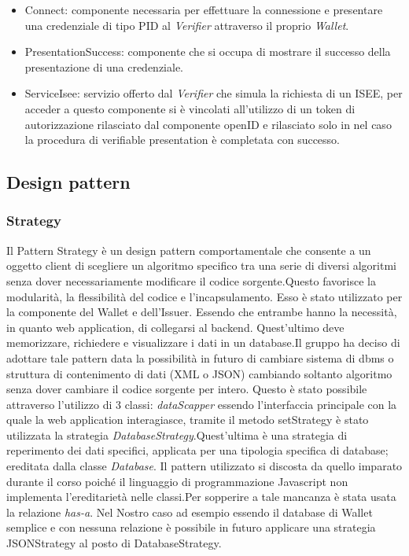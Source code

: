 \begin{itemize}
    \item Connect: componente necessaria per effettuare la connessione e presentare una credenziale di tipo PID al \textit{Verifier} attraverso il proprio \textit{Wallet}.
    \item PresentationSuccess: componente che si occupa di mostrare il successo della presentazione di una credenziale.
    \item ServiceIsee: servizio offerto dal \textit{Verifier} che simula la richiesta di un ISEE, per acceder a questo componente si è vincolati all'utilizzo di un token di autorizzazione rilasciato dal componente openID e rilasciato solo in nel caso la procedura di verifiable presentation è completata con successo. 
\end{itemize}

\subsection{Design pattern}
\subsubsection{Strategy}
Il Pattern Strategy è un design pattern comportamentale che consente a un oggetto client di scegliere un algoritmo specifico tra una serie di diversi algoritmi senza dover necessariamente modificare il codice sorgente.Questo favorisce la modularità, la flessibilità del codice e l'incapsulamento. 
Esso è stato utilizzato per la componente del Wallet e dell'Issuer. Essendo che entrambe hanno la necessità, in quanto web application, di collegarsi al backend. Quest'ultimo deve memorizzare, richiedere e visualizzare i dati in un database.Il gruppo ha deciso di adottare tale pattern data la possibilità in futuro di cambiare sistema di dbms o struttura di contenimento di dati (XML o JSON) cambiando soltanto algoritmo senza dover cambiare il codice sorgente per intero. 
Questo è stato possibile attraverso l'utilizzo di 3 classi: \textit{dataScapper} essendo l'interfaccia principale con la quale la web application interagiasce, tramite il metodo setStrategy è stato utilizzata la strategia \textit{DatabaseStrategy}.Quest'ultima è una strategia di reperimento dei dati specifici, applicata per una tipologia specifica di database; ereditata dalla classe \textit{Database}. 
Il pattern utilizzato si discosta da quello imparato durante il corso poiché il linguaggio di programmazione Javascript non implementa l'ereditarietà nelle classi.Per sopperire a tale mancanza è stata usata la relazione \textit{has-a}.
Nel Nostro caso ad esempio essendo il database di Wallet semplice e con nessuna relazione è possibile in futuro applicare una strategia JSONStrategy al posto di DatabaseStrategy.

